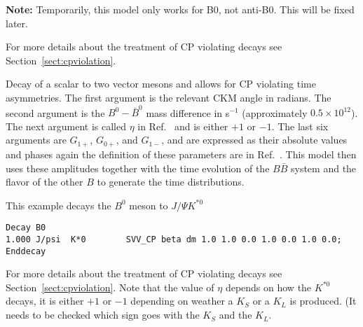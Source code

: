 {\bf Note:} Temporarily, this model only works for B0, not anti-B0. This
will be fixed later.



\Notes
For more details about the treatment of CP violating decays 
see Section~\ref{sect:cpviolation}.




\label{svvcp}



\Expl
Decay of a scalar to two vector mesons and allows for CP violating 
time asymmetries. The first argument is the relevant CKM
angle in radians. The second argument is the $B^0-\bar B^0$ mass difference
in s$^{-1}$ (approximately $0.5\times 10^{12}$). 
The next argument is called $\eta$ in Ref.~\cite{Duni91} and
is either $+1$ or $-1$. The last six arguments are $G_{1+}$,
$G_{0+}$, and $G_{1-}$, and are expressed as their absolute values
and phases again the definition of these parameters are in Ref.~\cite{Duni91}.
This model then uses these amplitudes 
together with the time evolution of the
$B\bar B$ system and the flavor of the other
$B$ to generate the time distributions.


\Example
This example decays the $B^0$ meson to $J/\Psi K^{*0}$
\begin{verbatim}
Decay B0
1.000 J/psi  K*0        SVV_CP beta dm 1.0 1.0 0.0 1.0 0.0 1.0 0.0;
Enddecay
\end{verbatim}

\Notes
For more details about the treatment of CP violating decays 
see Section~\ref{sect:cpviolation}. Note that the value of $\eta$
depends on how the $K^{*0}$ decays, it is either $+1$ or $-1$ 
depending on weather a $K_S$ or a $K_L$ is produced. (It needs
to be checked which sign goes with the $K_S$ and the $K_L$.





